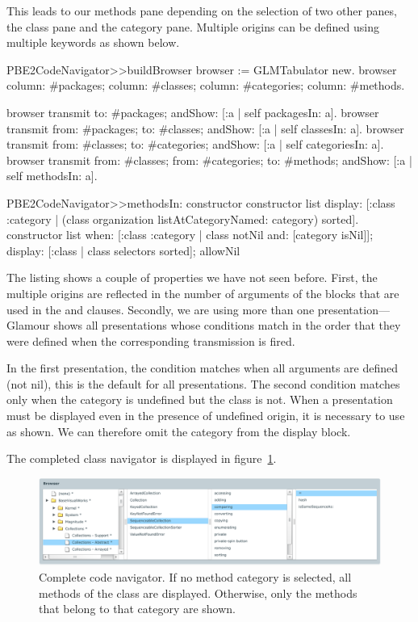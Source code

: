 \documentclass[a4paper,10pt,twoside]{book}
\begin{document}
This leads to our methods pane depending on the selection of two other
panes, the class pane and the category pane. Multiple origins can be
defined using multiple  keywords as shown below.

\begin{code}{}
PBE2CodeNavigator>>buildBrowser
  browser := GLMTabulator new.
  browser
    column: #packages;
    column:  #classes;
    column: #categories;
    column: #methods.

  browser transmit to: #packages; andShow: [:a | self packagesIn: a].
  browser transmit from: #packages; to: #classes; andShow: [:a | self classesIn: a].
  browser transmit from: #classes; to: #categories; andShow: [:a | self categoriesIn: a].
  browser transmit from: #classes; from: #categories; to: #methods; andShow: [:a | self methodsIn: a].

PBE2CodeNavigator>>methodsIn: constructor
  constructor list
    display: [:class :category | (class organization listAtCategoryNamed: category)
                                      sorted].
  constructor list
    when: [:class :category | class notNil and: [category isNil]];
    display: [:class | class selectors sorted];
    allowNil
\end{code}


The listing shows a couple of properties we have not seen
before. First, the multiple origins are reflected in the number of
arguments of the blocks that are used in the  and
 clauses. Secondly, we are using more than one
presentation---Glamour shows all presentations whose conditions match in
the order that they were defined when the corresponding transmission
is fired.

In the first presentation, the condition matches when all arguments
are defined (not nil), this is the default for all presentations. The
second condition matches only when the category is undefined but the
class is not. When a presentation must be displayed even in the
presence of undefined origin, it is necessary to use  as
shown. We can therefore omit the category from the display block.

The completed class navigator is displayed in
figure~\ref{fig:codenavigator}.

\begin{figure}[htbp]
\centerline{\includegraphics[width=\linewidth]{codenavigator.pdf}}
\caption{Complete code navigator. If no method category is selected, all methods of the class
are displayed. Otherwise, only the methods that belong to that category are shown.}
\label{fig:codenavigator}
\end{figure}
\end{document}
